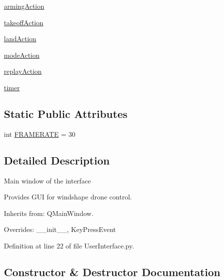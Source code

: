 \begin{DoxyCompactItemize}
\item 
\mbox{\hyperlink{classwindshape_1_1gui_1_1_user_interface_1_1_user_interface_a4335c684fb711c8ea017d719a9908af9}{arming\+Action}}
\item 
\mbox{\hyperlink{classwindshape_1_1gui_1_1_user_interface_1_1_user_interface_a30c66586b82281fc6196b583aeeae563}{takeoff\+Action}}
\item 
\mbox{\hyperlink{classwindshape_1_1gui_1_1_user_interface_1_1_user_interface_a90d5d7ddfb5627c64876f9ddf0082f18}{land\+Action}}
\item 
\mbox{\hyperlink{classwindshape_1_1gui_1_1_user_interface_1_1_user_interface_a036ab9bb46f313a8413d080c5ee26c14}{mode\+Action}}
\item 
\mbox{\hyperlink{classwindshape_1_1gui_1_1_user_interface_1_1_user_interface_a42322aaab290dadc8063ac4837aaea5f}{replay\+Action}}
\item 
\mbox{\hyperlink{classwindshape_1_1gui_1_1_user_interface_1_1_user_interface_a0251e0d99789387788399549cad6f0da}{timer}}
\end{DoxyCompactItemize}
\subsection*{Static Public Attributes}
\begin{DoxyCompactItemize}
\item 
int \mbox{\hyperlink{classwindshape_1_1gui_1_1_user_interface_1_1_user_interface_aa5772c60c377597fee847413d0691ee3}{F\+R\+A\+M\+E\+R\+A\+TE}} = 30
\end{DoxyCompactItemize}


\subsection{Detailed Description}
\begin{DoxyVerb}Main window of the interface

Provides GUI for windshape drone control.

Inherits from: QMainWindow.

Overrides: __init__, KeyPressEvent
\end{DoxyVerb}
 

Definition at line 22 of file User\+Interface.\+py.



\subsection{Constructor \& Destructor Documentation}
\mbox{\label{classwindshape_1_1gui_1_1_user_interface_1_1_user_interface_a6f829e97381911f73d54641581b471e3}} 
